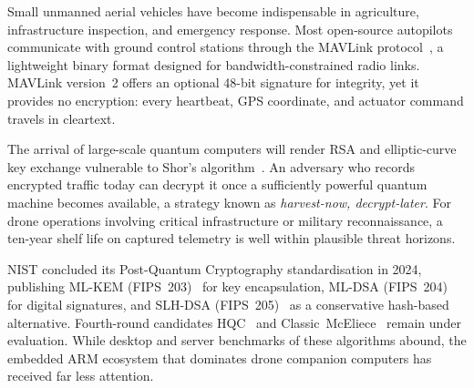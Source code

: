 \documentclass[conference]{IEEEtran}
\begin{document}
Small unmanned aerial vehicles have become indispensable in
agriculture, infrastructure inspection, and emergency response.
Most open-source autopilots communicate with ground control stations
through the MAVLink protocol~\cite{mavlink-spec}, a lightweight
binary format designed for bandwidth-constrained radio links.
MAVLink version~2 offers an optional 48-bit signature for integrity,
yet it provides no encryption: every heartbeat, GPS coordinate, and
actuator command travels in cleartext.

The arrival of large-scale quantum computers will render RSA and
elliptic-curve key exchange vulnerable to Shor's algorithm~\cite{shor1994}.
An adversary who records encrypted traffic today can decrypt it once
a sufficiently powerful quantum machine becomes available, a strategy
known as \emph{harvest-now, decrypt-later}.  For drone operations
involving critical infrastructure or military reconnaissance, a
ten-year shelf life on captured telemetry is well within plausible
threat horizons.

NIST concluded its Post-Quantum Cryptography standardisation in 2024,
publishing ML-KEM (FIPS~203)~\cite{nist-fips203} for key encapsulation,
ML-DSA (FIPS~204)~\cite{nist-fips204} for digital signatures, and
SLH-DSA (FIPS~205)~\cite{nist-fips205} as a conservative hash-based
alternative.  Fourth-round candidates HQC~\cite{hqc} and
Classic~McEliece~\cite{mceliece} remain under evaluation.
While desktop and server benchmarks of these algorithms abound, the
embedded ARM ecosystem that dominates drone companion computers
has received far less attention.
\end{document}
